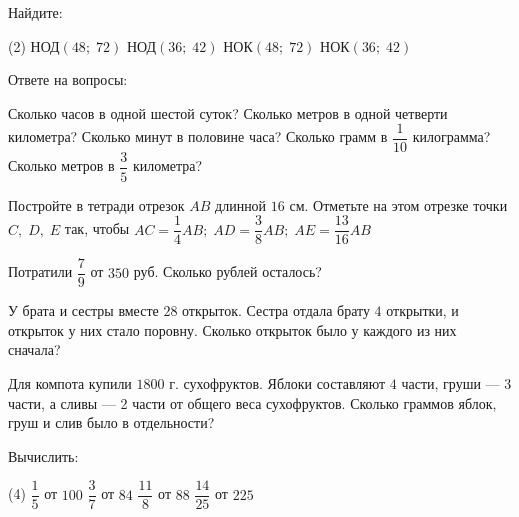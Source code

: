 \begin{homework}[number=1]
	\begin{listofex}
	\item Найдите:
	\begin{tasks}(2)
		\task НОД\( (48;\;72) \)
		\task НОД\( (36;\;42) \)
		\task НОК\( (48;\;72) \)
		\task НОК\( (36;\;42) \)
	\end{tasks}
	\item Ответе на вопросы:
	\begin{tasks}
		\task Сколько часов в одной шестой суток?
		\task Сколько метров в одной четверти километра?
		\task Сколько минут в половине часа?
		\task Сколько грамм в \( \dfrac{1}{10} \) килограмма?
		\task Сколько метров в \( \dfrac{3}{5} \) километра?
	\end{tasks}
	\item Постройте в тетради отрезок \( AB \) длинной \( 16 \) см. Отметьте на этом отрезке точки \( C,\;D,\;E \) так, чтобы \( AC=\dfrac{1}{4}AB;\;AD=\dfrac{3}{8}AB;\;AE=\dfrac{13}{16}AB \)
	\item Потратили \( \dfrac{7}{9} \) от \( 350 \) руб. Сколько рублей осталось?
	\item У брата и сестры вместе \( 28 \) открыток. Сестра отдала брату \( 4 \) открытки, и открыток у них стало поровну. Сколько открыток было у каждого из них сначала?
	\item Для компота купили \( 1800 \) г. сухофруктов. Яблоки составляют \( 4 \) части, груши --- 3 части, а сливы --- 2 части от общего веса сухофруктов. Сколько граммов яблок, груш и слив было в отдельности?
	\item Вычислить:
	\begin{tasks}(4)
		\task \( \dfrac{1}{5} \) от \( 100 \)
		\task \( \dfrac{3}{7} \) от \( 84 \)
		\task \( \dfrac{11}{8} \) от \( 88 \)
		\task \( \dfrac{14}{25} \) от \( 225 \)
	\end{tasks}
	\end{listofex}
\end{homework}

